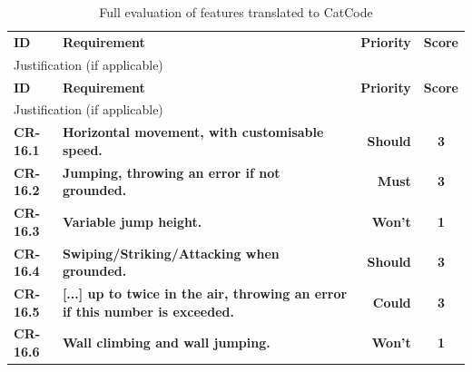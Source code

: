 \begin{center}
  \begin{longtable}{lp{9.5cm}rc}
    \caption{Full evaluation of features translated to CatCode} \label{tab:resultsFull/cr/autoCatFeaturesInCatCode} \\
    \toprule
    \textbf{ID}
    & \textbf{Requirement}
    & \textbf{Priority}
    & \textbf{Score} \\
    \multicolumn{4}{l}{
        Justification (if applicable)
    }
    \\ \midrule
    \endfirsthead
    \toprule
    \textbf{ID}
    & \textbf{Requirement}
    & \textbf{Priority}
    & \textbf{Score} \\
    \multicolumn{4}{l}{
        Justification (if applicable)
    }
    \\ \midrule
    \endhead
    \textbf{CR-16.1}
    & \textbf{Horizontal movement, with customisable speed.}
    & \textbf{Should}
    & \textbf{3}
    \\
    \textbf{CR-16.2}
    & \textbf{Jumping, throwing an error if not grounded.}
    & \textbf{Must}
    & \textbf{3}
    \\
    \textbf{CR-16.3}
    & \textbf{Variable jump height.}
    & \textbf{Won't}
    & \textbf{1}
    \\
    \textbf{CR-16.4}
    & \textbf{Swiping/Striking/Attacking when grounded.}
    & \textbf{Should}
    & \textbf{3}
    \\
    \textbf{CR-16.5}
    & \textbf{[...] up to twice in the air, throwing an error if this number is exceeded.}
    & \textbf{Could}
    & \textbf{3}
    \\
    \textbf{CR-16.6}
    & \textbf{Wall climbing and wall jumping.}
    & \textbf{Won't}
    & \textbf{1}
    \\ 
    \bottomrule
  \end{longtable}
\end{center}